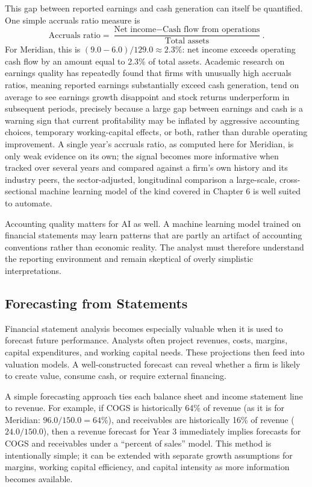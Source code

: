 \documentclass[../ai_in_finance]{subfiles}
\begin{document}
This gap between reported earnings and cash generation can itself be quantified. One simple accruals ratio measure is
\begin{equation*}
\text{Accruals ratio} = \frac{\text{Net income} - \text{Cash flow from operations}}{\text{Total assets}}.
\end{equation*}
For Meridian, this is $(9.0 - 6.0)/129.0 \approx 2.3\%$: net income exceeds operating cash flow by an amount equal to 2.3\% of total assets. Academic research on earnings quality has repeatedly found that firms with unusually high accruals ratios, meaning reported earnings substantially exceed cash generation, tend on average to see earnings growth disappoint and stock returns underperform in subsequent periods, precisely because a large gap between earnings and cash is a warning sign that current profitability may be inflated by aggressive accounting choices, temporary working-capital effects, or both, rather than durable operating improvement.
A single year's accruals ratio, as computed here for Meridian, is only weak evidence on its own; the signal becomes more informative when tracked over several years and compared against a firm's own history and its industry peers, the sector-adjusted, longitudinal comparison a large-scale, cross-sectional machine learning model of the kind covered in Chapter 6 is well suited to automate.

Accounting quality matters for AI as well. A machine learning model trained on financial statements may learn patterns that are partly an artifact of accounting conventions rather than economic reality. The analyst must therefore understand the reporting environment and remain skeptical of overly simplistic interpretations.

\subsection{Forecasting from Statements}

Financial statement analysis becomes especially valuable when it is used to forecast future performance. Analysts often project revenues, costs, margins, capital expenditures, and working capital needs. These projections then feed into valuation models. A well-constructed forecast can reveal whether a firm is likely to create value, consume cash, or require external financing.

A simple forecasting approach ties each balance sheet and income statement line to revenue. For example, if COGS is historically 64\% of revenue (as it is for Meridian: $96.0/150.0 = 64\%$), and receivables are historically 16\% of revenue ($24.0/150.0$), then a revenue forecast for Year 3 immediately implies forecasts for COGS and receivables under a ``percent of sales'' model. This method is intentionally simple; it can be extended with separate growth assumptions for margins, working capital efficiency, and capital intensity as more information becomes available.
\end{document}
